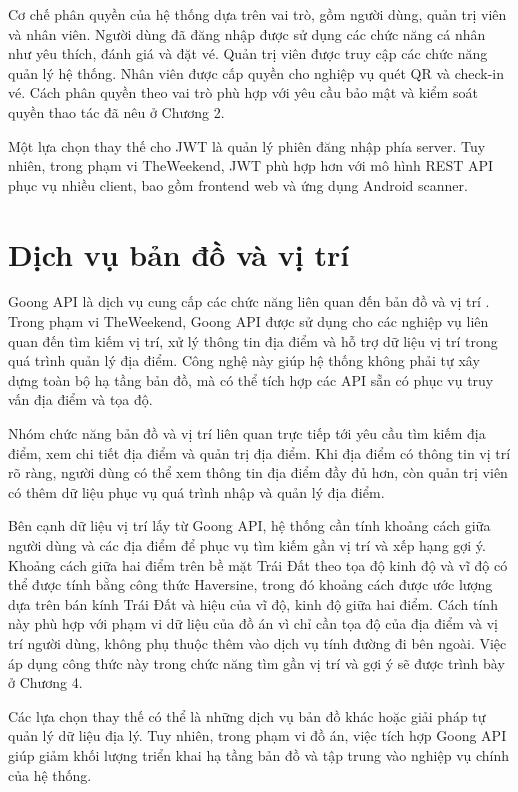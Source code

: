 \documentclass[../DoAn.tex]{subfiles}
\begin{document}
Cơ chế phân quyền của hệ thống dựa trên vai trò, gồm người dùng, quản trị viên và nhân viên. Người dùng đã đăng nhập được sử dụng các chức năng cá nhân như yêu thích, đánh giá và đặt vé. Quản trị viên được truy cập các chức năng quản lý hệ thống. Nhân viên được cấp quyền cho nghiệp vụ quét QR và check-in vé. Cách phân quyền theo vai trò phù hợp với yêu cầu bảo mật và kiểm soát quyền thao tác đã nêu ở Chương 2.

Một lựa chọn thay thế cho JWT là quản lý phiên đăng nhập phía server. Tuy nhiên, trong phạm vi TheWeekend, JWT phù hợp hơn với mô hình REST API phục vụ nhiều client, bao gồm frontend web và ứng dụng Android scanner.

\section{Dịch vụ bản đồ và vị trí}

Goong API là dịch vụ cung cấp các chức năng liên quan đến bản đồ và vị trí \cite{goong_api_docs}. Trong phạm vi TheWeekend, Goong API được sử dụng cho các nghiệp vụ liên quan đến tìm kiếm vị trí, xử lý thông tin địa điểm và hỗ trợ dữ liệu vị trí trong quá trình quản lý địa điểm. Công nghệ này giúp hệ thống không phải tự xây dựng toàn bộ hạ tầng bản đồ, mà có thể tích hợp các API sẵn có phục vụ truy vấn địa điểm và tọa độ.

Nhóm chức năng bản đồ và vị trí liên quan trực tiếp tới yêu cầu tìm kiếm địa điểm, xem chi tiết địa điểm và quản trị địa điểm. Khi địa điểm có thông tin vị trí rõ ràng, người dùng có thể xem thông tin địa điểm đầy đủ hơn, còn quản trị viên có thêm dữ liệu phục vụ quá trình nhập và quản lý địa điểm.

Bên cạnh dữ liệu vị trí lấy từ Goong API, hệ thống cần tính khoảng cách giữa người dùng và các địa điểm để phục vụ tìm kiếm gần vị trí và xếp hạng gợi ý. Khoảng cách giữa hai điểm trên bề mặt Trái Đất theo tọa độ kinh độ và vĩ độ có thể được tính bằng công thức Haversine, trong đó khoảng cách được ước lượng dựa trên bán kính Trái Đất và hiệu của vĩ độ, kinh độ giữa hai điểm. Cách tính này phù hợp với phạm vi dữ liệu của đồ án vì chỉ cần tọa độ của địa điểm và vị trí người dùng, không phụ thuộc thêm vào dịch vụ tính đường đi bên ngoài. Việc áp dụng công thức này trong chức năng tìm gần vị trí và gợi ý sẽ được trình bày ở Chương 4.

Các lựa chọn thay thế có thể là những dịch vụ bản đồ khác hoặc giải pháp tự quản lý dữ liệu địa lý. Tuy nhiên, trong phạm vi đồ án, việc tích hợp Goong API giúp giảm khối lượng triển khai hạ tầng bản đồ và tập trung vào nghiệp vụ chính của hệ thống.
\end{document}
